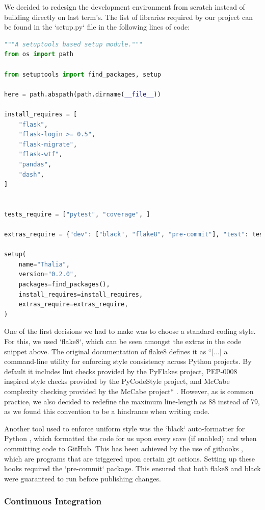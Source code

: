 \documentclass[main.tex]{subfiles}
\begin{document}
We decided to redesign the development environment from scratch instead of building directly on last term's. The list of libraries required by our project can be found in the `setup.py` file in the following lines of code:

\begin{lstlisting}[language=Python, caption=setup.py - Development environment, label=lst:Development_env]
"""A setuptools based setup module."""
from os import path

from setuptools import find_packages, setup

here = path.abspath(path.dirname(__file__))

install_requires = [
    "flask",
    "flask-login >= 0.5",
    "flask-migrate",
    "flask-wtf",
    "pandas",
    "dash",
]


tests_require = ["pytest", "coverage", ]

extras_require = {"dev": ["black", "flake8", "pre-commit"], "test": tests_require}

setup(
    name="Thalia",
    version="0.2.0",
    packages=find_packages(),
    install_requires=install_requires,
    extras_require=extras_require,
)
\end{lstlisting}

One of the first decisions we had to make was to choose a standard coding style. For this, we used `flake8`, which can be seen amongst the extras in the code snippet above. The original documentation of flake8 defines it as ``[...] a command-line utility for enforcing style consistency across Python projects. By default it includes lint checks provided by the PyFlakes project, PEP-0008 inspired style checks provided by the PyCodeStyle project, and McCabe complexity checking provided by the McCabe project`` \cite{flake8}. However, as is common practice, we also decided to redefine the maximum line-length as 88 instead of 79, as we found this convention to be a hindrance when writing code.

Another tool used to enforce uniform style was the `black` auto-formatter for Python \cite{black}, which formatted the code for us upon every save (if enabled) and when committing code to GitHub. This has been achieved by the use of githooks \cite{githooks}, which are programs that are triggered upon certain git actions. Setting up these hooks required the `pre-commit` package. This ensured that both flake8 and black were guaranteed to run before publishing changes.


\subsubsection{Continuous Integration}
\label{Continuous Integration}
\end{document}
